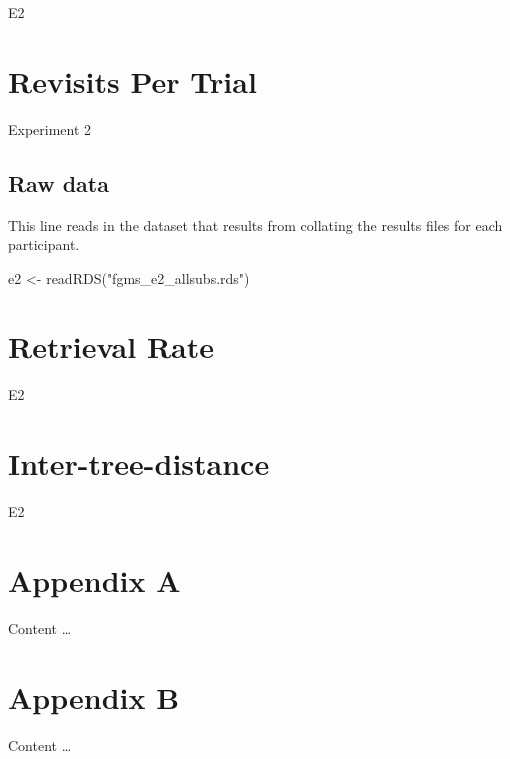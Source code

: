 \documentclass[
]{book}
\newenvironment{Shaded}{\begin{snugshade}}{\end{snugshade}}
\newcommand{\FunctionTok}[1]{\textcolor[rgb]{0.00,0.00,0.00}{#1}}
\newcommand{\NormalTok}[1]{#1}
\newcommand{\OtherTok}[1]{\textcolor[rgb]{0.56,0.35,0.01}{#1}}
\newcommand{\StringTok}[1]{\textcolor[rgb]{0.31,0.60,0.02}{#1}}
\begin{document}
E2

\hypertarget{revisits-per-trial-1}{%
\chapter{Revisits Per Trial}\label{revisits-per-trial-1}}

Experiment 2

\hypertarget{raw-data-1}{%
\section{Raw data}\label{raw-data-1}}

This line reads in the dataset that results from collating the results files for each participant.

\begin{Shaded}
\begin{Highlighting}[]
\NormalTok{e2 }\OtherTok{\textless{}{-}} \FunctionTok{readRDS}\NormalTok{(}\StringTok{"fgms\_e2\_allsubs.rds"}\NormalTok{)}
\end{Highlighting}
\end{Shaded}

\hypertarget{retrieval-rate-1}{%
\chapter{Retrieval Rate}\label{retrieval-rate-1}}

E2

\hypertarget{inter-tree-distance-1}{%
\chapter{Inter-tree-distance}\label{inter-tree-distance-1}}

E2

\hypertarget{appendix-appendices}{%
\appendix}


\hypertarget{appendix-a}{%
\chapter{Appendix A}\label{appendix-a}}

Content \ldots{}

\hypertarget{appendix-b}{%
\chapter{Appendix B}\label{appendix-b}}

Content \ldots{}

  
\end{document}
